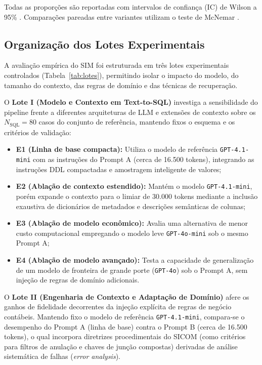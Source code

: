 \documentclass[12pt]{article}
\begin{document}
Todas as proporções são reportadas com intervalos de confiança (IC) de Wilson a 95\% \cite{Wilson1927,Agresti1998}. Comparações pareadas entre variantes utilizam o teste de McNemar \cite{Agresti1998}.

\subsection{Organização dos Lotes Experimentais}

A avaliação empírica do SIM foi estruturada em três lotes experimentais controlados (Tabela~\ref{tab:lotes}), permitindo isolar o impacto do modelo, do tamanho do contexto, das regras de domínio e das técnicas de recuperação.

O \textbf{Lote I (Modelo e Contexto em Text-to-SQL)} investiga a sensibilidade do pipeline frente a diferentes arquiteturas de LLM e extensões de contexto sobre os $N_{\text{SQL}} = 80$ casos do conjunto de referência, mantendo fixos o esquema e os critérios de validação:
\begin{itemize}
    \item \textbf{E1 (Linha de base compacta):} Utiliza o modelo de referência \texttt{GPT-4.1-mini} com as instruções do Prompt A (cerca de 16.500 tokens), integrando as instruções DDL compactadas e amostragem inteligente de valores;
    \item \textbf{E2 (Ablação de contexto estendido):} Mantém o modelo \texttt{GPT-4.1-mini}, porém expande o contexto para o limiar de 30.000 tokens mediante a inclusão exaustiva de dicionários de metadados e descrições semânticas de colunas;
    \item \textbf{E3 (Ablação de modelo econômico):} Avalia uma alternativa de menor custo computacional empregando o modelo leve \texttt{GPT-4o-mini} sob o mesmo Prompt A;
    \item \textbf{E4 (Ablação de modelo avançado):} Testa a capacidade de generalização de um modelo de fronteira de grande porte (\texttt{GPT-4o}) sob o Prompt A, sem injeção de regras de domínio adicionais.
\end{itemize}

O \textbf{Lote II (Engenharia de Contexto e Adaptação de Domínio)} afere os ganhos de fidelidade decorrentes da injeção explícita de regras de negócio contábeis. Mantendo fixo o modelo de referência \texttt{GPT-4.1-mini}, compara-se o desempenho do Prompt A (linha de base) contra o Prompt B (cerca de 16.500 tokens), o qual incorpora diretrizes procedimentais do SICOM (como critérios para filtros de anulação e chaves de junção compostas) derivadas de análise sistemática de falhas (\textit{error analysis}).
\end{document}
